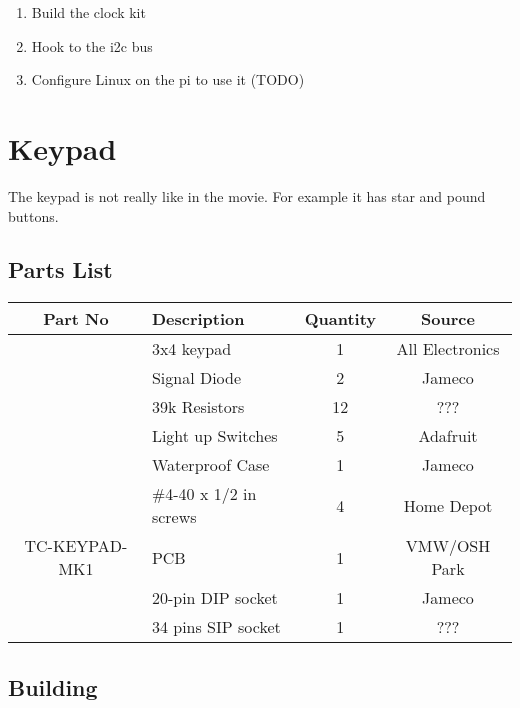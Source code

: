 \documentclass[11pt]{article}
\begin{document}
\begin{enumerate}
\item Build the clock kit
\item Hook to the i2c bus
\item Configure Linux on the pi to use it (TODO)
\end{enumerate}


\pagebreak
\section{Keypad}

The keypad is not really like in the movie.  For example
it has star and pound buttons.


\subsection{Parts List}

\begin{tabular}{|c|l|c|c|}
\hline
Part No	&  Description			&  Quantity	& Source \\
\hline
\hline
	& 3x4 keypad		& 1		& All Electronics \\
\hline
	& Signal Diode		& 2		& Jameco \\
\hline
	& 39k Resistors		& 12		& ??? \\

\hline
	& Light up Switches 	& 5		& Adafruit \\
\hline
	& Waterproof Case	& 1		& Jameco \\
\hline
	& \#4-40 x 1/2 in screws & 4		& Home Depot \\
\hline
TC-KEYPAD-MK1	& PCB		& 1		& VMW/OSH Park\\
\hline
	& 20-pin DIP socket	& 1		& Jameco\\
\hline
	& 34 pins SIP socket	& 1		& ??? \\
\hline
\end{tabular}

\subsection{Building}
\end{document}
